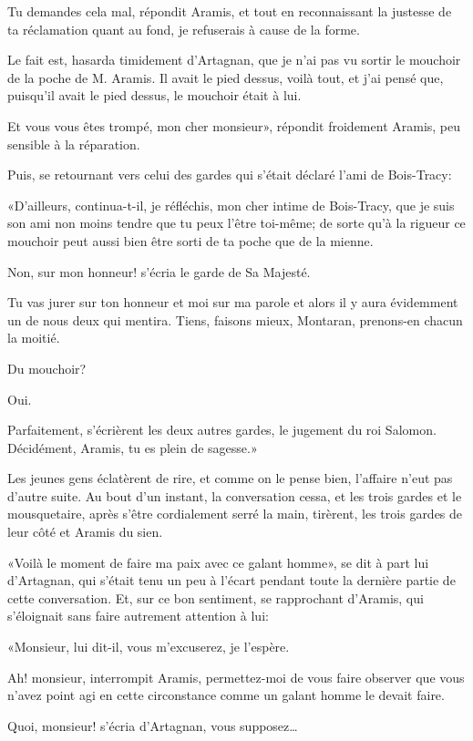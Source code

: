 \speak  Tu demandes cela mal, répondit Aramis, et tout en reconnaissant la justesse de ta réclamation quant au fond, je refuserais à cause de la forme. 

\speak  Le fait est, hasarda timidement d'Artagnan, que je n'ai pas vu sortir le mouchoir de la poche de M. Aramis. Il avait le pied dessus, voilà tout, et j'ai pensé que, puisqu'il avait le pied dessus, le mouchoir était à lui. 

\speak  Et vous vous êtes trompé, mon cher monsieur», répondit froidement Aramis, peu sensible à la réparation. 

Puis, se retournant vers celui des gardes qui s'était déclaré l'ami de Bois-Tracy: 

«D'ailleurs, continua-t-il, je réfléchis, mon cher intime de Bois-Tracy, que je suis son ami non moins tendre que tu peux l'être toi-même; de sorte qu'à la rigueur ce mouchoir peut aussi bien être sorti de ta poche que de la mienne. 

\speak  Non, sur mon honneur! s'écria le garde de Sa Majesté. 

\speak  Tu vas jurer sur ton honneur et moi sur ma parole et alors il y aura évidemment un de nous deux qui mentira. Tiens, faisons mieux, Montaran, prenons-en chacun la moitié. 

\speak  Du mouchoir? 

\speak  Oui. 

\speak  Parfaitement, s'écrièrent les deux autres gardes, le jugement du roi Salomon. Décidément, Aramis, tu es plein de sagesse.» 

Les jeunes gens éclatèrent de rire, et comme on le pense bien, l'affaire n'eut pas d'autre suite. Au bout d'un instant, la conversation cessa, et les trois gardes et le mousquetaire, après s'être cordialement serré la main, tirèrent, les trois gardes de leur côté et Aramis du sien. 

«Voilà le moment de faire ma paix avec ce galant homme», se dit à part lui d'Artagnan, qui s'était tenu un peu à l'écart pendant toute la dernière partie de cette conversation. Et, sur ce bon sentiment, se rapprochant d'Aramis, qui s'éloignait sans faire autrement attention à lui: 

«Monsieur, lui dit-il, vous m'excuserez, je l'espère. 

\speak  Ah! monsieur, interrompit Aramis, permettez-moi de vous faire observer que vous n'avez point agi en cette circonstance comme un galant homme le devait faire. 

\speak  Quoi, monsieur! s'écria d'Artagnan, vous supposez\dots 

